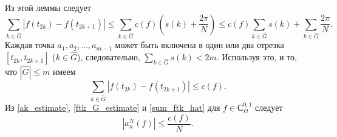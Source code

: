 Из этой леммы следует
\begin{equation*}
\sum_{k \in \hat{G}} \left| f(t_{2k}) - f(t_{2k+1}) \right| \leq
\sum_{k \in \hat{G}} c(f) \left(s(k) + \frac{2\pi}{N}\right) \leq
c(f) \sum_{k \in \hat{G}} s(k) + \sum_{k \in \hat{G}}\frac{2\pi}{N}.
\end{equation*}
Каждая точка $a_1,a_2,\ldots, a_{m-1}$
может быть включена в один или два отрезка $[t_{2k}, t_{2k+1}]$
($k \in \hat{G}$), следовательно, $\sum_{k \in \hat{G}} s(k) < 2m$. Используя это, и то, что $|\hat{G}| \leq m$ имеем
\begin{equation} \label{sum_ftk_hat}
\sum_{k \in \hat{G}} \left| f(t_{2k}) - f(t_{2k+1}) \right| \leq c(f).
\end{equation}
Из \eqref{ak_estimate}, \eqref{ftk_G_estimate} и \eqref{sum_ftk_hat}  для $f \in С^{0,1}_\Omega$ следует
\begin{equation}\label{an_estimate}
\left|a_{n}^{N}(f)\right| \leq \frac{c(f)}{N}.
\end{equation}

